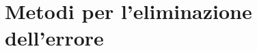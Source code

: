 \documentclass[\main/main.tex]{subfiles}
\begin{document}
\section{Metodi per l'eliminazione dell'errore}
\end{document}
